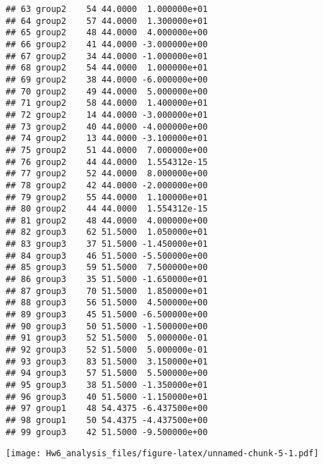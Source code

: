 \documentclass[
]{article}
\newenvironment{Shaded}{\begin{snugshade}}{\end{snugshade}}
\newcommand{\DataTypeTok}[1]{\textcolor[rgb]{0.13,0.29,0.53}{#1}}
\newcommand{\KeywordTok}[1]{\textcolor[rgb]{0.13,0.29,0.53}{\textbf{#1}}}
\newcommand{\NormalTok}[1]{#1}
\newcommand{\OperatorTok}[1]{\textcolor[rgb]{0.81,0.36,0.00}{\textbf{#1}}}
\newcommand{\StringTok}[1]{\textcolor[rgb]{0.31,0.60,0.02}{#1}}
\begin{document}
\begin{verbatim}
## 63 group2    54 44.0000  1.000000e+01
## 64 group2    57 44.0000  1.300000e+01
## 65 group2    48 44.0000  4.000000e+00
## 66 group2    41 44.0000 -3.000000e+00
## 67 group2    34 44.0000 -1.000000e+01
## 68 group2    54 44.0000  1.000000e+01
## 69 group2    38 44.0000 -6.000000e+00
## 70 group2    49 44.0000  5.000000e+00
## 71 group2    58 44.0000  1.400000e+01
## 72 group2    14 44.0000 -3.000000e+01
## 73 group2    40 44.0000 -4.000000e+00
## 74 group2    13 44.0000 -3.100000e+01
## 75 group2    51 44.0000  7.000000e+00
## 76 group2    44 44.0000  1.554312e-15
## 77 group2    52 44.0000  8.000000e+00
## 78 group2    42 44.0000 -2.000000e+00
## 79 group2    55 44.0000  1.100000e+01
## 80 group2    44 44.0000  1.554312e-15
## 81 group2    48 44.0000  4.000000e+00
## 82 group3    62 51.5000  1.050000e+01
## 83 group3    37 51.5000 -1.450000e+01
## 84 group3    46 51.5000 -5.500000e+00
## 85 group3    59 51.5000  7.500000e+00
## 86 group3    35 51.5000 -1.650000e+01
## 87 group3    70 51.5000  1.850000e+01
## 88 group3    56 51.5000  4.500000e+00
## 89 group3    45 51.5000 -6.500000e+00
## 90 group3    50 51.5000 -1.500000e+00
## 91 group3    52 51.5000  5.000000e-01
## 92 group3    52 51.5000  5.000000e-01
## 93 group3    83 51.5000  3.150000e+01
## 94 group3    57 51.5000  5.500000e+00
## 95 group3    38 51.5000 -1.350000e+01
## 96 group3    40 51.5000 -1.150000e+01
## 97 group1    48 54.4375 -6.437500e+00
## 98 group1    50 54.4375 -4.437500e+00
## 99 group3    42 51.5000 -9.500000e+00
\end{verbatim}

\begin{Shaded}
\end{Shaded}

\texttt{[image: Hw6\_analysis\_files/figure-latex/unnamed-chunk-5-1.pdf]}

\begin{Shaded}
\end{Shaded}
\end{document}
